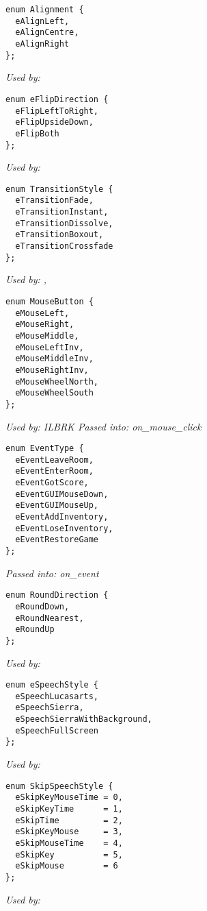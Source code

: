 \begin{verbatim}
enum Alignment {
  eAlignLeft,
  eAlignCentre,
  eAlignRight
};
\end{verbatim}
\it{Used by:} 

\begin{verbatim}
enum eFlipDirection {
  eFlipLeftToRight,
  eFlipUpsideDown,
  eFlipBoth
};
\end{verbatim}
\it{Used by:} 

\begin{verbatim}
enum TransitionStyle {
  eTransitionFade,
  eTransitionInstant,
  eTransitionDissolve,
  eTransitionBoxout,
  eTransitionCrossfade
};
\end{verbatim}
\it{Used by:} ,

\begin{verbatim}
enum MouseButton {
  eMouseLeft,
  eMouseRight,
  eMouseMiddle,
  eMouseLeftInv,
  eMouseMiddleInv,
  eMouseRightInv,
  eMouseWheelNorth,
  eMouseWheelSouth
};
\end{verbatim}
\it{Used by:}  ILBRK
\it{Passed into:} on_mouse_click

\begin{verbatim}
enum EventType {
  eEventLeaveRoom,
  eEventEnterRoom,
  eEventGotScore,
  eEventGUIMouseDown,
  eEventGUIMouseUp,
  eEventAddInventory,
  eEventLoseInventory,
  eEventRestoreGame
};
\end{verbatim}
\it{Passed into:} on_event

\begin{verbatim}
enum RoundDirection {
  eRoundDown,
  eRoundNearest,
  eRoundUp
};
\end{verbatim}
\it{Used by:} 

\begin{verbatim}
enum eSpeechStyle {
  eSpeechLucasarts,
  eSpeechSierra,
  eSpeechSierraWithBackground,
  eSpeechFullScreen
};
\end{verbatim}
\it{Used by:} 

\begin{verbatim}
enum SkipSpeechStyle {
  eSkipKeyMouseTime = 0,
  eSkipKeyTime      = 1,
  eSkipTime         = 2,
  eSkipKeyMouse     = 3,
  eSkipMouseTime    = 4,
  eSkipKey          = 5,
  eSkipMouse        = 6
};
\end{verbatim}
\it{Used by:} 

